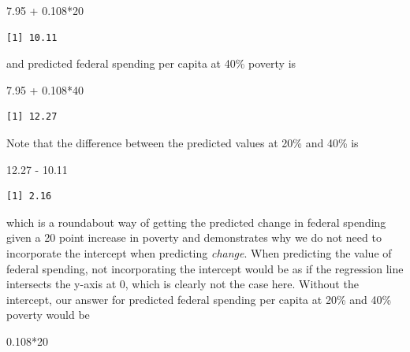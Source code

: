 \documentclass[
]{book}
\makeatletter
\newenvironment{Shaded}{\begin{snugshade}}{\end{snugshade}}
\newcommand{\DecValTok}[1]{\textcolor[rgb]{0.06,0.06,0.06}{#1}}
\newcommand{\FloatTok}[1]{\textcolor[rgb]{0.06,0.06,0.06}{#1}}
\newcommand{\SpecialCharTok}[1]{\textcolor[rgb]{0,0,0}{#1}}
\newenvironment{kframe}{%
\medskip{}
\setlength{\fboxsep}{.8em}
 \def\at@end@of@kframe{}%
 \ifinner\ifhmode%
  \def\at@end@of@kframe{\end{minipage}}%
  \begin{minipage}{\columnwidth}%
 \fi\fi%
 \def\FrameCommand##1{\hskip\@totalleftmargin \hskip-\fboxsep
 \colorbox{shadecolor}{##1}\hskip-\fboxsep
     \hskip-\linewidth \hskip-\@totalleftmargin \hskip\columnwidth}%
 \MakeFramed {\advance\hsize-\width
   \@totalleftmargin\z@ \linewidth\hsize
   \@setminipage}}%
 {\par\unskip\endMakeFramed%
 \at@end@of@kframe}
\renewenvironment{Shaded}{\begin{kframe}}{\end{kframe}}
\makeatother
\begin{document}
\begin{Shaded}
\begin{Highlighting}[]
\FloatTok{7.95} \SpecialCharTok{+} \FloatTok{0.108}\SpecialCharTok{*}\DecValTok{20}
\end{Highlighting}
\end{Shaded}

\begin{verbatim}
[1] 10.11
\end{verbatim}

and predicted federal spending per capita at 40\% poverty is

\begin{Shaded}
\begin{Highlighting}[]
\FloatTok{7.95} \SpecialCharTok{+} \FloatTok{0.108}\SpecialCharTok{*}\DecValTok{40}
\end{Highlighting}
\end{Shaded}

\begin{verbatim}
[1] 12.27
\end{verbatim}

Note that the difference between the predicted values at 20\% and 40\% is

\begin{Shaded}
\begin{Highlighting}[]
\FloatTok{12.27} \SpecialCharTok{{-}} \FloatTok{10.11}
\end{Highlighting}
\end{Shaded}

\begin{verbatim}
[1] 2.16
\end{verbatim}

which is a roundabout way of getting the predicted change in federal spending given a 20 point increase in poverty and demonstrates why we do not need to incorporate the intercept when predicting \emph{change}. When predicting the value of federal spending, not incorporating the intercept would be as if the regression line intersects the y-axis at 0, which is clearly not the case here. Without the intercept, our answer for predicted federal spending per capita at 20\% and 40\% poverty would be

\begin{Shaded}
\begin{Highlighting}[]
\FloatTok{0.108}\SpecialCharTok{*}\DecValTok{20}
\end{Highlighting}
\end{Shaded}
\end{document}
